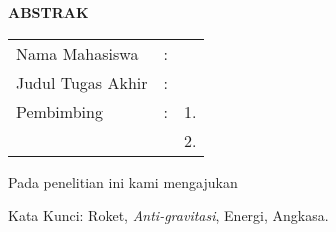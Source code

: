 \begin{center}
  \large\textbf{ABSTRAK}
\end{center}


\vspace{2ex}

\begingroup
\setlength{\tabcolsep}{0pt}

\noindent
\begin{tabularx}{\textwidth}{l >{\centering}m{2em} X}
  Nama Mahasiswa    & : & \name{}                                                                 \\

  Judul Tugas Akhir & : & \tatitle{} \\

  Pembimbing        & : & 1. \advisor{}                                                           \\
                    &   & 2. \coadvisor{}                                                         \\
\end{tabularx}
\endgroup

Pada penelitian ini kami mengajukan \lipsum[1]

Kata Kunci: Roket, \emph{Anti-gravitasi}, Energi, Angkasa.
